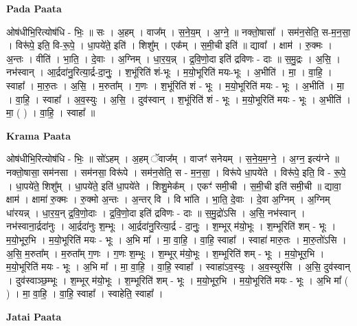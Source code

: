 \documentclass[17pt]{extarticle}
\begin{document}
\textbf{Pada Paata} \newline

ओष॑धीभि॒रित्योष॑धि - भिः॒ ॥ सः । अ॒हम् । वाज᳚म् । स॒ने॒य॒म् । अ॒ग्ने॒ ॥ नक्तो॒षासा᳚ । सम॑न॒सेति॒ स-म॒न॒सा॒ । विरू॑पे॒ इति॒ वि-रू॒पे॒ । धा॒पये॑ते॒ इति॑ । शिशु᳚म् । एक᳚म् । स॒मी॒ची इति॑ ॥ द्यावा᳚ । क्षाम॑ । रु॒क्मः । अ॒न्तः । वीति॑ । भा॒ति॒ । दे॒वाः । अ॒ग्निम् । धा॒र॒य॒न्न् । द्र॒वि॒णो॒दा इति॑ द्रविणः - दाः ॥ स॒मु॒द्रः । अ॒सि॒ । नभ॑स्वान् । आ॒र्द्रदा॑नु॒रित्या॒र्द्र-दा॒नुः॒ । श॒भूंरिति॑ शं-भूः । म॒यो॒भूरिति॑ मयः-भूः । अ॒भीति॑ । मा॒ । वा॒हि॒ । स्वाहा᳚ । मा॒रु॒तः । अ॒सि॒ । म॒रुता᳚म् । ग॒णः । श॒भूंरिति॑ शं - भूः । म॒यो॒भूरिति॑ मयः - भूः । अ॒भीति॑ । मा॒ । वा॒हि॒ । स्वाहा᳚ । अ॒व॒स्युः । अ॒सि॒ । दुव॑स्वान् । श॒भूंरिति॑ शं - भूः । म॒यो॒भूरिति॑ मयः - भूः । अ॒भीति॑ । मा॒ ( ) । वा॒हि॒ । स्वाहा᳚ ॥  \newline


\textbf{Krama Paata} \newline

ओष॑धीभि॒रित्योष॑धि - भिः॒ ॥ सो॑ऽहम् । अ॒हम् ॅवाज᳚म् । वाजꣳ॑ सनेयम् । स॒ने॒य॒म॒ग्ने॒ । अ॒ग्न॒ इत्य॑ग्ने ॥ नक्तो॒षासा॒ सम॑नसा । सम॑नसा॒ विरू॑पे । सम॑न॒सेति॒ स - म॒न॒सा॒ । विरू॑पे धा॒पये॑ते । विरू॑पे॒ इति॒ वि - रू॒पे॒ । धा॒पये॑ते॒ शिशु᳚म् । धा॒पये॑ते॒ इति॑ धा॒पये॑ते । शिशु॒मेक᳚म् । एकꣳ॑ समी॒ची । स॒मी॒ची इति॑ समी॒ची ॥ द्यावा॒ क्षाम॑ । क्षामा॑ रु॒क्मः । रु॒क्मो अ॒न्तः । अ॒न्तर् वि । वि भा॑ति । भा॒ति॒ दे॒वाः । दे॒वा अ॒ग्निम् । अ॒ग्निम् धा॑रयन्न् । धा॒र॒य॒न् द्र॒वि॒णो॒दाः । द्र॒वि॒णो॒दा इति॑ द्रविणः - दाः ॥ स॒मु॒द्रो॑ऽसि । अ॒सि॒ नभ॑स्वान् । नभ॑स्वाना॒र्द्रदा॑नुः । आ॒र्द्रदा॑नुः श॒म्भूः । आ॒र्द्रदा॑नु॒रित्या॒र्द्र - दा॒नुः॒ । श॒म्भूर् म॑यो॒भूः । श॒म्भूरिति॑ शम् - भूः । म॒यो॒भूर॒भि । म॒यो॒भूरिति॑ मयः - भूः । अ॒भि मा᳚ । मा॒ वा॒हि॒ । वा॒हि॒ स्वाहा᳚ । स्वाहा॑ मारु॒तः । मा॒रु॒तो॑ऽसि । अ॒सि॒ म॒रुता᳚म् । म॒रुता᳚म् ग॒णः । ग॒णः श॒म्भूः । श॒म्भूर् म॑यो॒भूः । श॒म्भूरिति॑ शम् - भूः । म॒यो॒भूर॒भि । म॒यो॒भूरिति॑ मयः - भूः । अ॒भि मा᳚ । मा॒ वा॒हि॒ । वा॒हि॒ स्वाहा᳚ । स्वाहा॑ऽव॒स्युः । अ॒व॒स्युर॑सि । अ॒सि॒ दुव॑स्वान् । दुव॑स्वाञ्छ॒म्भूः । श॒म्भूर् म॑यो॒भूः । श॒म्भूरिति॑ शम् - भूः । म॒यो॒भूर॒भि । म॒यो॒भूरिति॑ मयः - भूः । अ॒भि मा᳚ ( ) । मा॒ वा॒हि॒ । वा॒हि॒ स्वाहा᳚ । स्वाहेति॒ स्वाहा᳚ । \newline

\textbf{Jatai Paata} \newline
\end{document}
